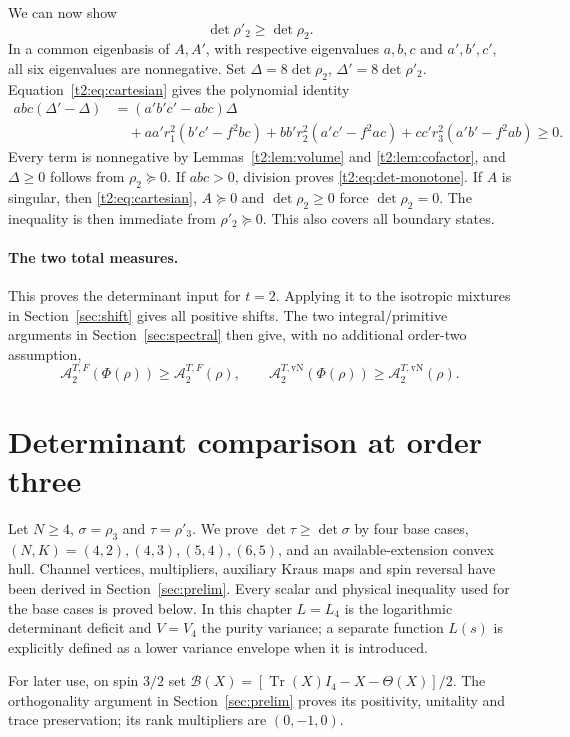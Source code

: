 \documentclass[11pt,a4paper]{article}
\newcommand{\A}{\mathcal A}
\begin{document}
We can now show
\begin{equation}\label{t2:eq:det-monotone}
 \det\rho'_2\ge\det\rho_2.
\end{equation}
In a common eigenbasis of $A,A'$, with respective eigenvalues $a,b,c$
and $a',b',c'$, all six eigenvalues are nonnegative. Set
$\Delta=8\det\rho_2$, $\Delta'=8\det\rho'_2$.
Equation~\eqref{t2:eq:cartesian} gives the polynomial identity
\begin{align*}
 abc(\Delta'-\Delta)
 &=(a'b'c'-abc)\Delta\\
 &\quad+aa'r_1^2(b'c'-f^2bc)
       +bb'r_2^2(a'c'-f^2ac)
       +cc'r_3^2(a'b'-f^2ab)\ge0.
\end{align*}
Every term is nonnegative by Lemmas~\ref{t2:lem:volume} and
\ref{t2:lem:cofactor}, and $\Delta\ge0$ follows from $\rho_2\succeq0$.
If $abc>0$, division proves \eqref{t2:eq:det-monotone}.
If $A$ is singular, then
\eqref{t2:eq:cartesian}, $A\succeq0$ and $\det\rho_2\ge0$ force
$\det\rho_2=0$. The inequality is then immediate from
$\rho'_2\succeq0$. This also covers all boundary states.


\paragraph{The two total measures.}
This proves the determinant input for $t=2$. Applying it to the isotropic
mixtures in Section~\ref{sec:shift} gives all positive shifts. The two
integral/primitive arguments in Section~\ref{sec:spectral} then give,
with no additional order-two assumption,
\[
 \A_2^{T,F}(\Phi(\rho))\ge\A_2^{T,F}(\rho),\qquad
 \A_2^{T,\mathrm{vN}}(\Phi(\rho))\ge\A_2^{T,\mathrm{vN}}(\rho).
\]

\clearpage
\section{Determinant comparison at order three}\label{sec:t3}
Let $N\ge4$, $\sigma=\rho_3$ and $\tau=\rho'_3$. We prove
$\det\tau\ge\det\sigma$ by four base cases,
$(N,K)=(4,2),(4,3),(5,4),(6,5)$, and an available-extension convex hull.
Channel vertices, multipliers, auxiliary Kraus maps and spin reversal have
been derived in Section~\ref{sec:prelim}. Every scalar and physical
inequality used for the base cases is proved below. In this chapter
$L=L_4$ is the logarithmic determinant deficit and $V=V_4$ the purity
variance; a separate function $L(s)$ is explicitly defined as a lower
variance envelope when it is introduced.

For later use, on spin $3/2$ set
$\mathcal B(X)=[\operatorname{Tr}(X)I_4-X-\Theta(X)]/2$.
The orthogonality argument in Section~\ref{sec:prelim} proves its
positivity, unitality and trace preservation; its rank multipliers are
$(0,-1,0)$.
\end{document}
